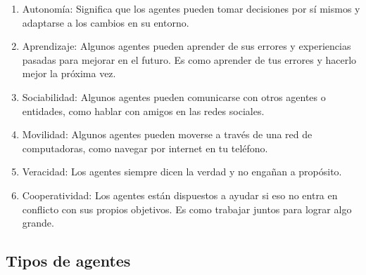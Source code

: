\begin{enumerate}
    \item Autonomía: Significa que los agentes pueden tomar decisiones por sí mismos y adaptarse 
    a los cambios en su entorno.
    
    \item Aprendizaje: Algunos agentes pueden aprender de sus errores y experiencias pasadas para 
    mejorar en el futuro. Es como aprender de tus errores y hacerlo mejor la próxima vez.
    
    \item Sociabilidad: Algunos agentes pueden comunicarse con otros agentes o entidades, como 
    hablar con amigos en las redes sociales.
    
    \item Movilidad: Algunos agentes pueden moverse a través de una red de computadoras, como 
    navegar por internet en tu teléfono.
    
    \item Veracidad: Los agentes siempre dicen la verdad y no engañan a propósito.
    
    \item Cooperatividad: Los agentes están dispuestos a ayudar si eso no entra en conflicto con 
    sus propios objetivos. Es como trabajar juntos para lograr algo grande.    
\end{enumerate}


\subsection{Tipos de agentes}

